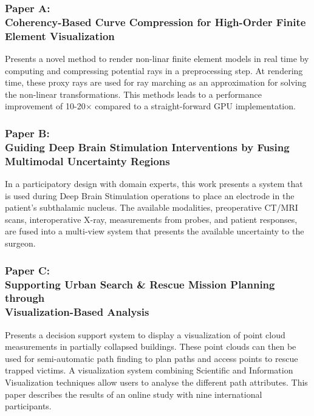 \subsubsection{Paper A:\\Coherency-Based Curve Compression for High-Order Finite Element Visualization}
Presents a novel method to render non-linar finite element models in real time by computing and compressing potential rays in a preprocessing step. At rendering time, these proxy rays are used for ray marching as an approximation for solving the non-linear transformations. This methods leads to a performance improvement of 10-20$\times$ compared to a straight-forward GPU implementation.%

\subsubsection{Paper B:\\Guiding Deep Brain Stimulation Interventions by Fusing Multimodal Uncertainty Regions}
In a participatory design with domain experts, this work presents a system that is used during Deep Brain Stimulation operations to place an electrode in the patient's subthalamic nucleus. The available modalities, preoperative CT/MRI scans, interoperative X-ray, measurements from probes, and patient responses, are fused into a multi-view system that presents the available uncertainty to the surgeon.%

\subsubsection{Paper C:\\Supporting Urban Search \& Rescue Mission Planning through \\Visualization-Based Analysis}
Presents a decision support system to display a  visualization of point cloud measurements in partially collapsed buildings. These point clouds can then be used for semi-automatic path finding to plan paths and access points to rescue trapped victims. A visualization system combining Scientific and Information Visualization techniques allow users to analyse the different path attributes. This paper describes the results of an online study with nine international participants.%


